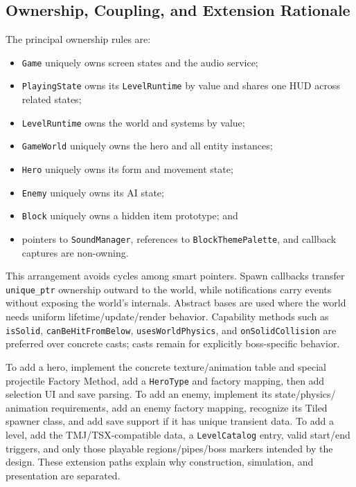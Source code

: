 \subsection{Ownership, Coupling, and Extension Rationale}

The principal ownership rules are:

\begin{itemize}
    \item \texttt{Game} uniquely owns screen states and the audio service;
    \item \texttt{PlayingState} owns its \texttt{LevelRuntime} by value and
    shares one HUD across related states;
    \item \texttt{LevelRuntime} owns the world and systems by value;
    \item \texttt{GameWorld} uniquely owns the hero and all entity instances;
    \item \texttt{Hero} uniquely owns its form and movement state;
    \item \texttt{Enemy} uniquely owns its AI state;
    \item \texttt{Block} uniquely owns a hidden item prototype; and
    \item pointers to \texttt{SoundManager}, references to
    \texttt{BlockThemePalette}, and callback captures are non-owning.
\end{itemize}

This arrangement avoids cycles among smart pointers.  Spawn callbacks transfer
\texttt{unique\_ptr} ownership outward to the world, while notifications carry
events without exposing the world's internals.  Abstract bases are used where
the world needs uniform lifetime/update/render behavior.  Capability methods
such as \texttt{isSolid}, \texttt{canBeHitFromBelow},
\texttt{usesWorldPhysics}, and \texttt{onSolidCollision} are preferred over
concrete casts; casts remain for explicitly boss-specific behavior.

To add a hero, implement the concrete texture/animation table and special
projectile Factory Method, add a \texttt{HeroType} and factory mapping, then add
selection UI and save parsing.  To add an enemy, implement its state/physics/
animation requirements, add an enemy factory mapping, recognize its Tiled
spawner class, and add save support if it has unique transient data.  To add a
level, add the TMJ/TSX-compatible data, a \texttt{LevelCatalog} entry, valid
start/end triggers, and only those playable regions/pipes/boss markers intended
by the design.  These extension paths explain why construction, simulation,
and presentation are separated.

